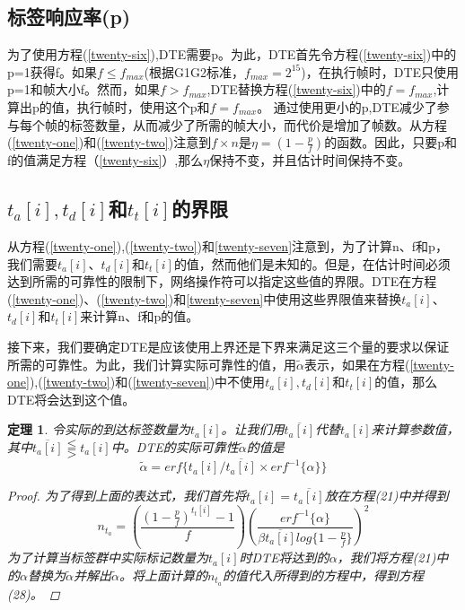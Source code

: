 \documentclass[UTF8]{ctexart}
\newtheorem{theorem}{定理}
\newtheorem*{proof}{证明}
\begin{document}
	\subsection{标签响应率(p)}
	
	为了使用方程(\ref{twenty-six}),DTE需要p。为此，DTE首先令方程(\ref{twenty-six})中的p=1获得f。如果$f \le f_{max}$(根据G1G2标准，$f_{max}=2^{15}$)，在执行帧时，DTE只使用p=1和帧大小f。然而，如果$f > f_{max}$,DTE替换方程(\ref{twenty-six})中的$f=f_{max}$,计算出p的值，执行帧时，使用这个p和$f=f_{max}$。	
	通过使用更小的p,DTE减少了参与每个帧的标签数量，从而减少了所需的帧大小，而代价是增加了帧数。从方程(\ref{twenty-one})和(\ref{twenty-two})注意到$f\times n$是$\eta =(1-\frac{p}{f})$的函数。因此，只要p和f的值满足方程（\ref{twenty-six}）,那么$\eta$保持不变，并且估计时间保持不变。
	
	\subsection{$t_a[i],t_d[i]$和$t_t[i]$的界限}
	
	从方程(\ref{twenty-one}),(\ref{twenty-two})和\ref{twenty-seven}注意到，为了计算n、f和p，我们需要$t_a[i]$、$t_d[i]$和$t_t[i]$的值，然而他们是未知的。但是，在估计时间必须达到所需的可靠性的限制下，网络操作符可以指定这些值的界限。DTE在方程(\ref{twenty-one})、(\ref{twenty-two})和\ref{twenty-seven}中使用这些界限值来替换$t_a[i]$、$t_d[i]$和$t_t[i]$来计算n、f和p的值。
	
	接下来，我们要确定DTE是应该使用上界还是下界来满足这三个量的要求以保证所需的可靠性。为此，我们计算实际可靠性的值，用$\widetilde{\alpha}$表示，如果在方程(\ref{twenty-one}),(\ref{twenty-two})和(\ref{twenty-seven})中不使用$t_a[i],t_d[i]和t_t[i]$的值，那么DTE将会达到这个值。
	\begin{theorem}\label{theorem-7}
		\emph{令实际的到达标签数量为$t_a[i]$。让我们用$\overline{t_a[i]}$代替$t_a[i]$来计算参数值，其中$\overline{t_a[i]}\lesseqqgtr t_a[i]$中。DTE的实际可靠性$\tilde{\alpha}$的值是}
		\begin{equation}
		\tilde{\alpha} = erf\{t_a[i]/\overline{t_a[i]}\times erf^{-1}\{\alpha\}\}
		\end{equation}
		\begin{proof}
			为了得到上面的表达式，我们首先将$t_a[i] = \overline{t_a[i]}$放在方程(21)中并得到
			\begin{displaymath}
			n_{t_a} = \left(\frac{(1-\frac{p}{f})^{t_t[i]}-1}{f}\right)\left(\frac{erf^{-1}\{\alpha\}}{\beta \overline{t_a[i]}log\{1-\frac{p}{f}\}}\right)^2
			\end{displaymath}
			为了计算当标签群中实际标记数量为$t_a[i]$时DTE将达到的$\alpha$，我们将方程(21)中的$\alpha$替换为$\tilde{\alpha}$并解出$\tilde{\alpha}$。将上面计算的$n_{t_a}$的值代入所得到的方程中，得到方程(28)。
		\end{proof}
	\end{theorem}
	
\end{document}
